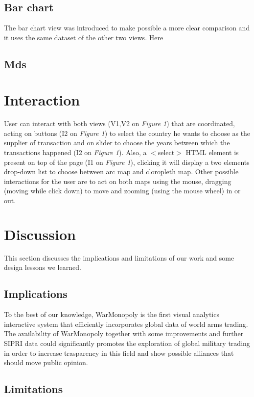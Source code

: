 \documentclass{article}
\begin{document}
\begin{multicols}{2}
\subsection{Bar chart}

The bar chart view was introduced to make possible a more clear comparison and it uses the same dataset of the other two views. Here 

\subsection{Mds}

\section{Interaction}
User can interact with both views (V1,V2 on \textit{Figure 1}) that are coordinated, acting on buttons (I2 on \textit{Figure 1}) to select the country he wants to choose as the supplier of transaction and on slider to choose the years between which the transactions happened (I2 on \textit{Figure 1}). Also, a $<$select$>$ HTML element is present on top of the page (I1 on \textit{Figure 1}), clicking it will display a two elements drop-down list to choose between arc map and cloropleth map. Other possible interactions for the user are  to act on both maps using the mouse, dragging (moving while click down) to move and zooming (using the mouse wheel) in or out. 



\section{Discussion}

This section discusses the implications and limitations of our work and some design lessons we learned.
\subsection{Implications}
To the best of our knowledge, WarMonopoly is the first visual analytics interactive system that efficiently incorporates  global data of world arms trading. The availability of WarMonopoly together with some improvements and further SIPRI data could 
significantly promotes the exploration of global military trading in order to increase trasparency in this field and show possible alliances that should move public opinion. 

\subsection{Limitations}


\end{multicols}
\end{document}
